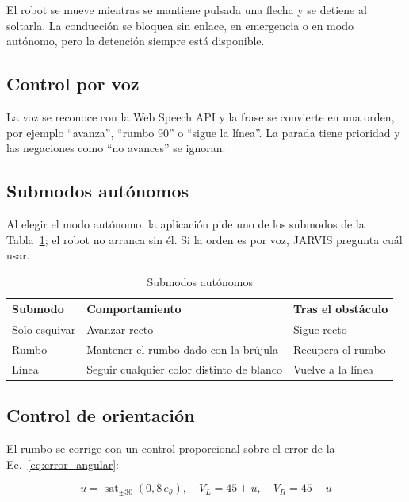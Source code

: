 \documentclass[journal]{IEEEtran}
\begin{document}
El robot se mueve mientras se mantiene pulsada una flecha y se detiene al soltarla. La conducción se bloquea sin enlace, en emergencia o en modo autónomo, pero la detención siempre está disponible.

\subsection{Control por voz}

La voz se reconoce con la Web Speech API y la frase se convierte en una orden, por ejemplo ``avanza'', ``rumbo 90'' o ``sigue la línea''. La parada tiene prioridad y las negaciones como ``no avances'' se ignoran.

\subsection{Submodos autónomos}

Al elegir el modo autónomo, la aplicación pide uno de los submodos de la Tabla~\ref{tab:submodos}; el robot no arranca sin él. Si la orden es por voz, JARVIS pregunta cuál usar.

\begin{table}[H]
\centering
\caption{Submodos autónomos}
\label{tab:submodos}
\scriptsize
\begin{tabular}{p{} p{} p{}}
\toprule
\textbf{Submodo} & \textbf{Comportamiento} & \textbf{Tras el obstáculo} \\
\midrule
Solo esquivar & Avanzar recto & Sigue recto \\
Rumbo & Mantener el rumbo dado con la brújula & Recupera el rumbo \\
Línea & Seguir cualquier color distinto de blanco & Vuelve a la línea \\
\bottomrule
\end{tabular}
\end{table}

\subsection{Control de orientación}

El rumbo se corrige con un control proporcional sobre el error de la Ec.~\ref{eq:error_angular}:

\begin{equation}
u=\operatorname{sat}_{\pm 30}(0{,}8\,e_\theta),\quad
V_L=45+u,\quad V_R=45-u
\label{eq:control}
\end{equation}
\end{document}
